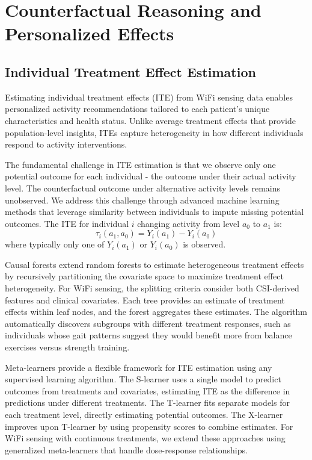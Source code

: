 \documentclass[journal]{IEEEtran}
\begin{document}
\section{Counterfactual Reasoning and Personalized Effects}

\subsection{Individual Treatment Effect Estimation}

Estimating individual treatment effects (ITE) from WiFi sensing data enables personalized activity recommendations tailored to each patient's unique characteristics and health status. Unlike average treatment effects that provide population-level insights, ITEs capture heterogeneity in how different individuals respond to activity interventions.

The fundamental challenge in ITE estimation is that we observe only one potential outcome for each individual - the outcome under their actual activity level. The counterfactual outcome under alternative activity levels remains unobserved. We address this challenge through advanced machine learning methods that leverage similarity between individuals to impute missing potential outcomes. The ITE for individual $i$ changing activity from level $a_0$ to $a_1$ is:
$$\tau_i(a_1, a_0) = Y_i(a_1) - Y_i(a_0)$$
where typically only one of $Y_i(a_1)$ or $Y_i(a_0)$ is observed.

Causal forests extend random forests to estimate heterogeneous treatment effects by recursively partitioning the covariate space to maximize treatment effect heterogeneity. For WiFi sensing, the splitting criteria consider both CSI-derived features and clinical covariates. Each tree provides an estimate of treatment effects within leaf nodes, and the forest aggregates these estimates. The algorithm automatically discovers subgroups with different treatment responses, such as individuals whose gait patterns suggest they would benefit more from balance exercises versus strength training.

Meta-learners provide a flexible framework for ITE estimation using any supervised learning algorithm. The S-learner uses a single model to predict outcomes from treatments and covariates, estimating ITE as the difference in predictions under different treatments. The T-learner fits separate models for each treatment level, directly estimating potential outcomes. The X-learner improves upon T-learner by using propensity scores to combine estimates. For WiFi sensing with continuous treatments, we extend these approaches using generalized meta-learners that handle dose-response relationships.
\end{document}
